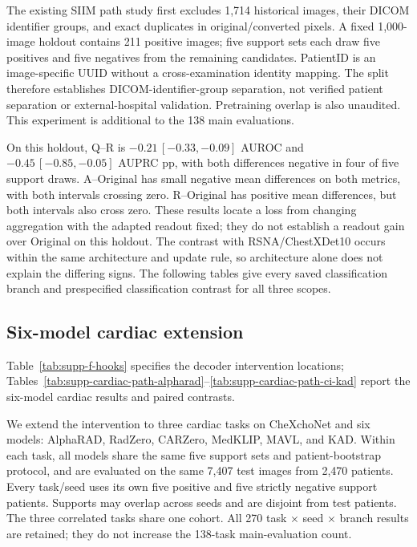The existing SIIM path study first excludes 1,714 historical images, their DICOM identifier groups, and exact duplicates in original/converted pixels. A fixed 1,000-image holdout contains 211 positive images; five support sets each draw five positives and five negatives from the remaining candidates. PatientID is an image-specific UUID without a cross-examination identity mapping. The split therefore establishes DICOM-identifier-group separation, not verified patient separation or external-hospital validation. Pretraining overlap is also unaudited. This experiment is additional to the 138 main evaluations.

On this holdout, Q--R is $-0.21\,[-0.33,-0.09]$ AUROC and $-0.45\,[-0.85,-0.05]$ AUPRC pp, with both differences negative in four of five support draws. A--Original has small negative mean differences on both metrics, with both intervals crossing zero. R--Original has positive mean differences, but both intervals also cross zero. These results locate a loss from changing aggregation with the adapted readout fixed; they do not establish a readout gain over Original on this holdout. The contrast with RSNA/ChestXDet10 occurs within the same architecture and update rule, so architecture alone does not explain the differing signs. The following tables give every saved classification branch and prespecified classification contrast for all three scopes.



\subsection{Six-model cardiac extension}
\label{supp:cardiac_paths}
Table~\ref{tab:supp-f-hooks} specifies the decoder intervention locations; Tables~\ref{tab:supp-cardiac-path-alpharad}--\ref{tab:supp-cardiac-path-ci-kad} report the six-model cardiac results and paired contrasts.

We extend the intervention to three cardiac tasks on CheXchoNet and six models: AlphaRAD, RadZero, CARZero, MedKLIP, MAVL, and KAD. Within each task, all models share the same five support sets and patient-bootstrap protocol, and are evaluated on the same 7,407 test images from 2,470 patients. Every task/seed uses its own five positive and five strictly negative support patients. Supports may overlap across seeds and are disjoint from test patients. The three correlated tasks share one cohort. All 270 task $\times$ seed $\times$ branch results are retained; they do not increase the 138-task main-evaluation count.

